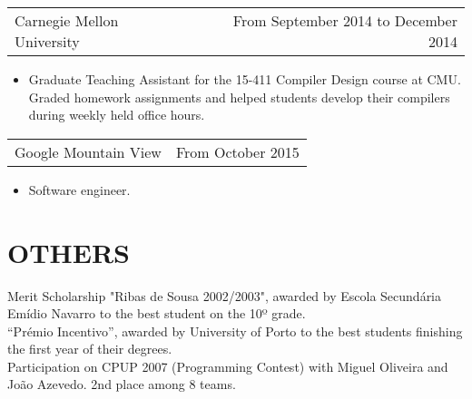 \documentclass[margin]{res}
\begin{document}
\begin{resume}
                  \begin{tabular}{p{3in} r} %
                    Carnegie Mellon University &  From September 2014 to December 2014
                   \end{tabular}
                    \begin{itemize}					        
                     \item[] Graduate Teaching Assistant for the 15-411 Compiler Design course at CMU. Graded homework assignments and helped students develop their compilers during weekly held office hours.
                    \end{itemize}

                  \begin{tabular}{p{3in} r} %
                    Google Mountain View &  From October 2015
                   \end{tabular}
                    \begin{itemize}
                      \item[] Software engineer.
                    \end{itemize}

\section{OTHERS} Merit Scholarship "Ribas de Sousa 2002/2003", awarded by Escola Secundária Emídio Navarro to the best student on the 10º grade. \\
                  “Prémio Incentivo”, awarded by University of Porto to the best students finishing the first year of their degrees. \\
                  Participation on CPUP 2007 (Programming Contest) with Miguel Oliveira and João Azevedo. 2nd place among 8 teams. \\
                  

\end{resume}
\end{document}
